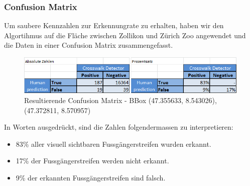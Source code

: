 \subsubsection{Confusion Matrix}
Um saubere Kennzahlen zur Erkennungrate zu erhalten, haben wir den Algortihmus auf die Fläche zwischen Zollikon und Zürich Zoo angewendet und die Daten in einer Confusion Matrix zusammengefasst.
\\
\begin{figure}[H]
	\centering
	\includegraphics[]{images/Confusionmatrix_dl_end.png}
	\caption[Resultierende Confusion Matrix]{Resultierende Confusion Matrix - BBox (47.355633, 8.543026), (47.372811, 8.570957)}
\end{figure}
In Worten ausgedrückt, sind die Zahlen folgendermassen zu interpretieren:
\begin{itemize}
	\item 83\% aller visuell sichtbaren Fussgängerstreifen wurden erkannt.
	\item 17\% der Fussgängerstreifen werden nicht erkannt.
	\item 9\% der erkannten Fussgängerstreifen sind falsch.
\end{itemize}
			


